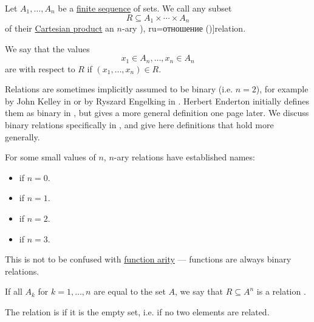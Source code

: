 \begin{definition}\label{def:relation}
  Let \( A_1, \ldots, A_n \) be a \hyperref[def:sequence]{finite sequence} of sets. We call any subset
  \begin{equation*}
    R \subseteq A_1 \times \cdots \times A_n
  \end{equation*}
  of their \hyperref[def:cartesian_product/product]{Cartesian product} an \( n \)-ary \term[bg=релация (\cite[5]{КоцевСидеров2016}), ru=отношение (\cite[sec. 9.3]{Тыртышников2007})]{relation}.

  We say that the values
  \begin{equation*}
    x_1 \in A_n, \ldots, x_n \in A_n
  \end{equation*}
  are  with respect to \( R \) if \( (x_1, \ldots, x_n) \in R \).

  Relations are sometimes implicitly assumed to be binary (i.e. \( n = 2 \)), for example by John Kelley in \cite[7]{Kelley1975} or by Ryszard Engelking in \cite[1]{Engelking1989}. Herbert Enderton initially defines them as binary in , but gives a more general definition one page later. We discuss binary relations specifically in , and give here definitions that hold more generally.

  \begin{thmenum}[series=def:relation]
     For some small values of \( n \), \( n \)-ary relations have established names:
    \begin{itemize}
      \item {} if \( n = 0 \).
      \item {} if \( n = 1 \).
      \item {} if \( n = 2 \).
      \item {} if \( n = 3 \).
    \end{itemize}

    This is not to be confused with \hyperref[rem:function_arguments]{function arity} --- functions are always binary relations.

     If all \( A_k \) for \( k = 1, \ldots, n \) are equal to the set \( A \), we say that \( R \subseteq A^n \) is a relation .

     The relation is  if it is the empty set, i.e. if no two elements are related.
  \end{thmenum}
\end{definition}

